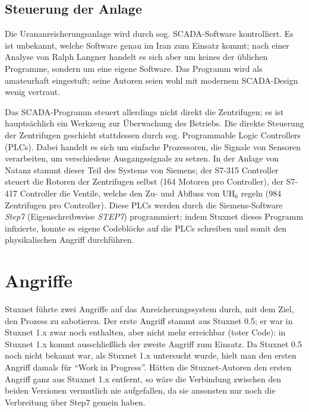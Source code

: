 \documentclass{article}
\begin{document}
\subsection{Steuerung der Anlage}

Die Urananreicherungsanlage wird durch sog. SCADA-Software kontrolliert.
Es ist unbekannt, welche Software genau im Iran zum Einsatz kommt;
nach einer Analyse von Ralph Langner\cite{tkac} handelt es sich aber um keines der üblichen Programme, %
sondern um eine eigene Software.
Das Programm wird als amateurhaft eingestuft;
seine Autoren seien wohl mit modernem SCADA-Design wenig vertraut. %

Das SCADA-Programm steuert allerdings nicht direkt die Zentrifugen;
es ist hauptsächlich ein Werkzeug zur Überwachung des Betriebs. %
Die direkte Steuerung der Zentrifugen geschieht stattdessen durch sog. Programmable Logic Controllers (PLCs).
Dabei handelt es sich um einfache Prozessoren, die Signale von Sensoren verarbeiten,
um verschiedene Ausgangssignale zu setzen.
In der Anlage von Natanz stammt dieser Teil des Systems von Siemens;
der S7-315 Controller steuert die Rotoren der Zentrifugen selbst (164 Motoren pro Controller), %
der S7-417 Controller die Ventile, welche den Zu- und Abfluss von $\mathrm{UH}_6$ regeln (984 Zentrifugen pro Controller).
Diese PLCs werden durch die Siemens-Software \emph{Step7} (Eigenschreibweise \emph{STEP7}) programmiert;
indem Stuxnet dieses Programm infizierte, konnte es eigene Codeblöcke auf die PLCs schreiben
und somit den physikalischen Angriff durchführen.

\section{Angriffe}

Stuxnet führte zwei Angriffe auf das Anreicherungssystem durch, mit dem Ziel, den Prozess zu sabotieren.
Der erste Angriff stammt aus Stuxnet 0.5;
er war in Stuxnet 1.x zwar noch enthalten, aber nicht mehr erreichbar (toter Code):
in Stuxnet 1.x kommt ausschließlich der zweite Angriff zum Einsatz.
Da Stuxnet 0.5 noch nicht bekannt war, als Stuxnet 1.x untersucht wurde,
hielt man den ersten Angriff damals für ``Work in Progress''.\cite{dossier} %
Hätten die Stuxnet-Autoren den ersten Angriff ganz aus Stuxnet 1.x entfernt,
so wäre die Verbindung zwischen den beiden Versionen vermutlich nie aufgefallen,
da sie ansonsten nur noch die Verbreitung über Step7 gemein haben.\cite{05} %
\end{document}
